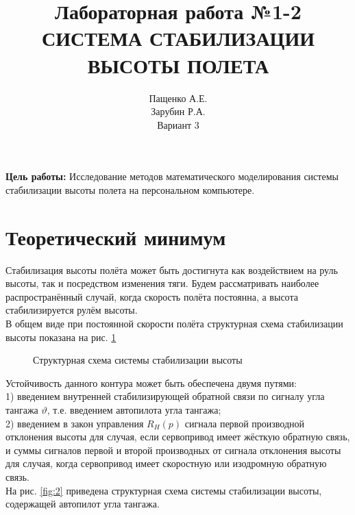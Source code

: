 \documentclass[a4paper,12pt]{article}
\title{\textbf{Лабораторная работа №1-2}\\ СИСТЕМА СТАБИЛИЗАЦИИ ВЫСОТЫ ПОЛЕТА}
\author{Пащенко А.Е.\\Зарубин Р.А.\\Вариант 3}
\date{}
\begin{document}
 

\maketitle %
\textbf{Цель работы:} Исследование методов математического моделирования системы стабилизации высоты полета на персональном компьютере.
\section{Теоретический минимум}
Стабилизация высоты полёта может быть достигнута как воздействием на руль высоты, так и посредством изменения тяги. Будем рассматривать наиболее распространённый случай, 
когда скорость полёта постоянна, а высота стабилизируется рулём высоты.\\
В общем виде при постоянной скорости полёта структурная схема стабилизации высоты показана 
на рис. \ref{fig:1}

\begin{figure}[H]
    \caption{Структурная схема системы стабилизации высоты}
    \label{fig:1}
\end{figure}
 
Устойчивость данного контура может быть обеспечена двумя путями: \\ 

1) введением внутренней стабилизирующей обратной связи по сигналу угла тангажа 
$\vartheta$, т.е. введением автопилота угла тангажа;\\

2) введением в закон управления $R_{H}(p)$ сигнала первой производной отклонения высоты для случая, если сервопривод имеет жёсткую обратную связь,
и суммы сигналов первой и второй производных от сигнала отклонения высоты для случая, 
когда сервопривод имеет скоростную или изодромную обратную связь.\\

На рис. \ref{fig:2} приведена структурная схема системы стабилизации высоты, содержащей автопилот угла тангажа.
\end{document}
